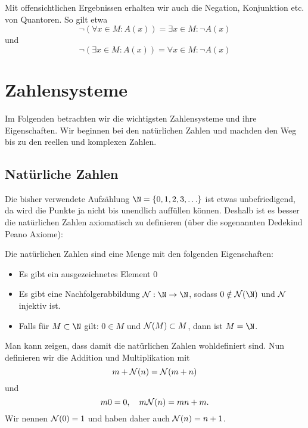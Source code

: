 \documentclass[letterpaper,10pt,english]{jupyterBook}
\begin{document}
Mit offensichtlichen Ergebnissen erhalten wir auch die Negation, Konjunktion etc. von Quantoren. So gilt etwa
\begin{equation*}
\lnot( \forall x \in M: A(x) ) = \exists x \in M: \lnot A(x)
\end{equation*}
und
\begin{equation*}
\lnot( \exists x \in M: A(x) ) = \forall x \in M: \lnot A(x)
\end{equation*}

\section{Zahlensysteme}
\label{\detokenize{grundlagen/zahlensysteme:zahlensysteme}}\label{\detokenize{grundlagen/zahlensysteme::doc}}
Im Folgenden betrachten wir die wichtigsten Zahlensysteme und ihre Eigenschaften. Wir beginnen bei den natürlichen Zahlen und machden den Weg bis zu den reellen und komplexen Zahlen.


\subsection{Natürliche Zahlen}
\label{\detokenize{grundlagen/zahlensysteme:naturliche-zahlen}}
Die bisher verwendete Aufzählung \(\N = \{0,1,2,3,\ldots\}\) ist etwas unbefriedigend, da wird die Punkte ja nicht bis unendlich auffüllen können. Deshalb ist es besser die natürlichen Zahlen axiomatisch zu definieren (über die sogenannten Dedekind Peano Axiome):
\label{grundlagen/zahlensysteme:definition-0}
\begin{definition}{}{}



Die natürlichen Zahlen sind eine Menge mit den folgenden Eigenschaften:
\begin{itemize}
\item {} 
Es gibt ein ausgezeichnetes Element \(0\)

\item {} 
Es gibt eine Nachfolgerabbildung \({\cal N}:\N \rightarrow \N\), sodass \(0 \notin {\cal N}(\N)\) und \({\cal N}\) injektiv ist.

\item {} 
Falls für \(M \subset \N\) gilt: \(0 \in M\) und \({\cal N}(M) \subset M\), dann ist \(M=\N\).

\end{itemize}
\end{definition}

Man kann zeigen, dass damit die natürlichen Zahlen wohldefiniert sind. Nun definieren wir die Addition und Multiplikation mit
\begin{equation*}
 m + {\cal N}(n) = {\cal N}(m+n)
\end{equation*}
und
\begin{equation*}
 m 0 = 0, \quad m {\cal N}(n) = mn +m.
\end{equation*}
Wir nennen \({\cal N}(0)=1\) und haben daher auch
\( {\cal N}(n) = n+1\).
\end{document}
